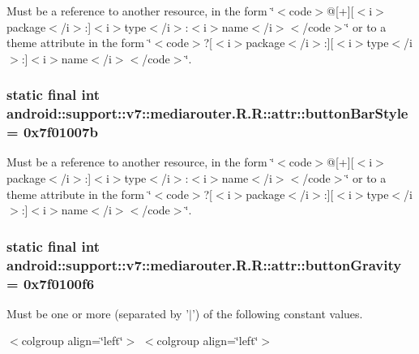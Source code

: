 Must be a reference to another resource, in the form \char`\"{}$<$code$>$@\mbox{[}+\mbox{]}\mbox{[}$<$i$>$package$<$/i$>$:\mbox{]}$<$i$>$type$<$/i$>$:$<$i$>$name$<$/i$>$$<$/code$>$\char`\"{} or to a theme attribute in the form \char`\"{}$<$code$>$?\mbox{[}$<$i$>$package$<$/i$>$:\mbox{]}\mbox{[}$<$i$>$type$<$/i$>$:\mbox{]}$<$i$>$name$<$/i$>$$<$/code$>$\char`\"{}. \hypertarget{classandroid_1_1support_1_1v7_1_1mediarouter_1_1_r_1_1attr_2c6c8224ee9da456654f94a89a1a549d}{
\subsubsection[{buttonBarStyle}]{\setlength{\rightskip}{0pt plus 5cm}static final int android::support::v7::mediarouter.R.R::attr::buttonBarStyle = 0x7f01007b}}
\label{classandroid_1_1support_1_1v7_1_1mediarouter_1_1_r_1_1attr_2c6c8224ee9da456654f94a89a1a549d}


Must be a reference to another resource, in the form \char`\"{}$<$code$>$@\mbox{[}+\mbox{]}\mbox{[}$<$i$>$package$<$/i$>$:\mbox{]}$<$i$>$type$<$/i$>$:$<$i$>$name$<$/i$>$$<$/code$>$\char`\"{} or to a theme attribute in the form \char`\"{}$<$code$>$?\mbox{[}$<$i$>$package$<$/i$>$:\mbox{]}\mbox{[}$<$i$>$type$<$/i$>$:\mbox{]}$<$i$>$name$<$/i$>$$<$/code$>$\char`\"{}. \hypertarget{classandroid_1_1support_1_1v7_1_1mediarouter_1_1_r_1_1attr_6db10f92809b327eb517a3e08e1f13a4}{
\subsubsection[{buttonGravity}]{\setlength{\rightskip}{0pt plus 5cm}static final int android::support::v7::mediarouter.R.R::attr::buttonGravity = 0x7f0100f6}}
\label{classandroid_1_1support_1_1v7_1_1mediarouter_1_1_r_1_1attr_6db10f92809b327eb517a3e08e1f13a4}


Must be one or more (separated by '$|$') of the following constant values. \begin{TabularC}{0}
\hline
\end{TabularC}
$<$colgroup align=\char`\"{}left\char`\"{}$>$ $<$colgroup align=\char`\"{}left\char`\"{}$>$ 

